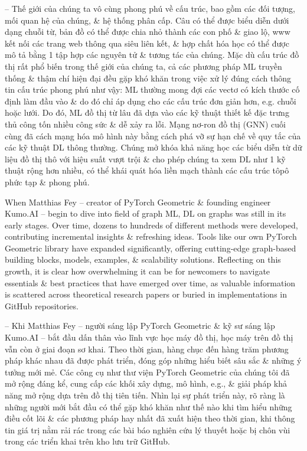 \documentclass{article}
\begin{document}
\begin{itemize}
    -- Thế giới của chúng ta vô cùng phong phú về cấu trúc, bao gồm các đối tượng, mối quan hệ của chúng, \& hệ thống phân cấp. Câu có thể được biểu diễn dưới dạng chuỗi từ, bản đồ có thể được chia nhỏ thành các con phố \& giao lộ, www kết nối các trang web thông qua siêu liên kết, \& hợp chất hóa học có thể được mô tả bằng 1 tập hợp các nguyên tử \& tương tác của chúng. Mặc dù cấu trúc đồ thị rất phổ biến trong thế giới của chúng ta, cả các phương pháp ML truyền thống \& thậm chí hiện đại đều gặp khó khăn trong việc xử lý đúng cách thông tin cấu trúc phong phú như vậy: ML thường mong đợi các vectơ có kích thước cố định làm đầu vào \& do đó chỉ áp dụng cho các cấu trúc đơn giản hơn, e.g. chuỗi hoặc lưới. Do đó, ML đồ thị từ lâu đã dựa vào các kỹ thuật thiết kế đặc trưng thủ công tốn nhiều công sức \& dễ xảy ra lỗi. Mạng nơ-ron đồ thị (GNN) cuối cùng đã cách mạng hóa mô hình này bằng cách phá vỡ sự hạn chế về quy tắc của các kỹ thuật DL thông thường. Chúng mở khóa khả năng học các biểu diễn từ dữ liệu đồ thị thô với hiệu suất vượt trội \& cho phép chúng ta xem DL như 1 kỹ thuật rộng hơn nhiều, có thể khái quát hóa liền mạch thành các cấu trúc tôpô phức tạp \& phong phú.

    When {\sc Matthias Fey} -- creator of PyTorch Geometric \& founding engineer Kumo.AI -- begin to dive into field of graph ML, DL on graphs was still in its early stages. Over time, dozens to hundreds of different methods were developed, contributing incremental insights \& refreshing ideas. Tools like our own PyTorch Geometric library have expanded significantly, offering cutting-edge graph-based building blocks, models, examples, \& scalability solutions. Reflecting on this growth, it is clear how overwhelming it can be for newcomers to navigate essentials \& best practices that have emerged over time, as valuable information is scattered across theoretical research papers or buried in implementations in GitHub repositories.

    -- Khi {\sc Matthias Fey} -- người sáng lập PyTorch Geometric \& kỹ sư sáng lập Kumo.AI -- bắt đầu dấn thân vào lĩnh vực học máy đồ thị, học máy trên đồ thị vẫn còn ở giai đoạn sơ khai. Theo thời gian, hàng chục đến hàng trăm phương pháp khác nhau đã được phát triển, đóng góp những hiểu biết sâu sắc \& những ý tưởng mới mẻ. Các công cụ như thư viện PyTorch Geometric của chúng tôi đã mở rộng đáng kể, cung cấp các khối xây dựng, mô hình, e.g., \& giải pháp khả năng mở rộng dựa trên đồ thị tiên tiến. Nhìn lại sự phát triển này, rõ ràng là những người mới bắt đầu có thể gặp khó khăn như thế nào khi tìm hiểu những điều cốt lõi \& các phương pháp hay nhất đã xuất hiện theo thời gian, khi thông tin giá trị nằm rải rác trong các bài báo nghiên cứu lý thuyết hoặc bị chôn vùi trong các triển khai trên kho lưu trữ GitHub.


\end{itemize}
\end{document}
